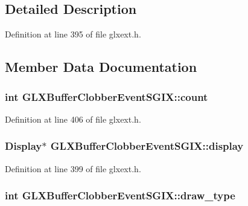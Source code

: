 \subsection{Detailed Description}


Definition at line 395 of file glxext.h.



\subsection{Member Data Documentation}
\hypertarget{struct_g_l_x_buffer_clobber_event_s_g_i_x_ad8f4f0aae058e0a1ff542679823e37a9}{
\subsubsection[{count}]{\setlength{\rightskip}{0pt plus 5cm}int {\bf GLXBufferClobberEventSGIX::count}}}
\label{struct_g_l_x_buffer_clobber_event_s_g_i_x_ad8f4f0aae058e0a1ff542679823e37a9}


Definition at line 406 of file glxext.h.

\hypertarget{struct_g_l_x_buffer_clobber_event_s_g_i_x_afef060d81026da75c846727f4a3de9d4}{
\subsubsection[{display}]{\setlength{\rightskip}{0pt plus 5cm}Display$\ast$ {\bf GLXBufferClobberEventSGIX::display}}}
\label{struct_g_l_x_buffer_clobber_event_s_g_i_x_afef060d81026da75c846727f4a3de9d4}


Definition at line 399 of file glxext.h.

\hypertarget{struct_g_l_x_buffer_clobber_event_s_g_i_x_a25c31e8cbec0919f74a1e93ae74175b1}{
\subsubsection[{draw\_\-type}]{\setlength{\rightskip}{0pt plus 5cm}int {\bf GLXBufferClobberEventSGIX::draw\_\-type}}}
\label{struct_g_l_x_buffer_clobber_event_s_g_i_x_a25c31e8cbec0919f74a1e93ae74175b1}


